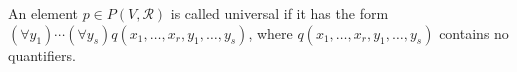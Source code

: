 An element $p \in P(V, \mathcal{R})$ is called universal if it has the form $(\forall y_1) \cdots (\forall y_s) q(x_1, \ldots, x_r, y_1, \ldots, y_s)$, where $q(x_1, \ldots, x_r, y_1, \ldots, y_s)$ contains no quantifiers.
